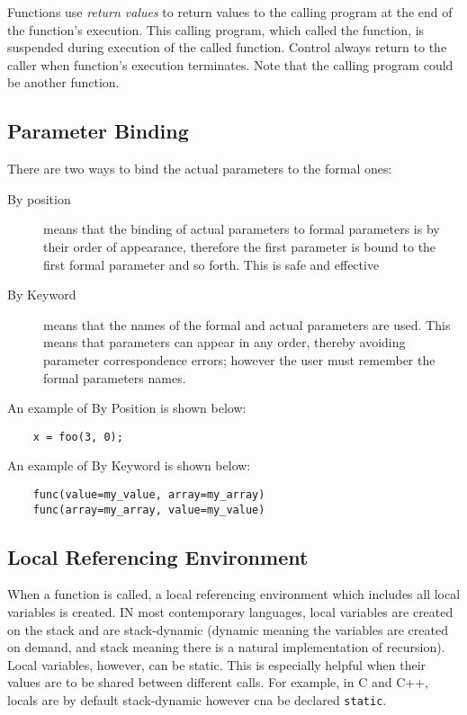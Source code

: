 Functions use \textit{return values} to return values to the calling program at the end of the function's execution. This calling program, which called the function, is suspended during execution of the called function. Control always return to the caller when function's execution terminates. Note that the calling program could be another function. 

\subsection{Parameter Binding}
There are two ways to bind the actual parameters to the formal ones:
\begin{description}
    \item[By position] means that the binding of actual parameters to formal parameters is by their order of appearance, therefore the first parameter is bound to the first formal parameter and so forth.  This is safe and effective
    \item[By Keyword] means that the names of the formal and actual parameters are used. This means that parameters can appear in any order, thereby avoiding parameter correspondence errors; however the user must remember the formal parameters names.
\end{description}

An example of By Position is shown below:
\begin{verbatim}
    x = foo(3, 0);
\end{verbatim}
An example of By Keyword is shown below:
\begin{verbatim}
    func(value=my_value, array=my_array)
    func(array=my_array, value=my_value)
\end{verbatim}

\subsection{Local Referencing Environment}
When a function is called, a local referencing environment which includes all local variables is created. IN most contemporary languages, local variables are created on the stack and are stack-dynamic (dynamic meaning the variables are created on demand, and stack meaning there is a natural implementation of recursion).\\

Local variables, however, can be static. This is especially helpful when their values are to be shared between different calls. For example, in C and C++, locals are by default stack-dynamic however cna be declared \verb|static|. 

